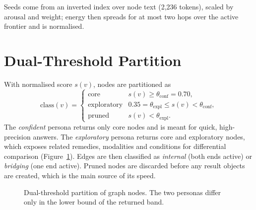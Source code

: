 \documentclass[12pt,a4paper,oneside]{report}
\begin{document}
Seeds come from an inverted index over node text (2,236 tokens), scaled by arousal and weight; energy then spreads for at most two hops over the active frontier and is normalised.

\section{Dual-Threshold Partition}
With normalised score $s(v)$, nodes are partitioned as
\begin{equation}
  \text{class}(v) = \begin{cases}
  \text{core} & s(v) \ge \theta_{\text{conf}} = 0.70,\\
  \text{exploratory} & 0.35 = \theta_{\text{expl}} \le s(v) < \theta_{\text{conf}},\\
  \text{pruned} & s(v) < \theta_{\text{expl}}.
  \end{cases}
\end{equation}
The \emph{confident} persona returns only core nodes and is meant for quick, high-precision answers. The \emph{exploratory} persona returns core and exploratory nodes, which exposes related remedies, modalities and conditions for differential comparison (Figure~\ref{fig:persona}). Edges are then classified as \emph{internal} (both ends active) or \emph{bridging} (one end active). Pruned nodes are discarded before any result objects are created, which is the main source of its speed.

\begin{figure}[H]
\centering
{}
\caption{Dual-threshold partition of graph nodes. The two personas differ only in the lower bound of the returned band.}
\label{fig:persona}
\end{figure}
\end{document}
